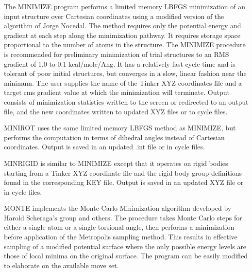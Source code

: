 \documentclass[letterpaper,11pt,english]{sphinxmanual}
\begin{document}
\sphinxAtStartPar
{}

\sphinxAtStartPar
The MINIMIZE program performs a limited memory L\sphinxhyphen{}BFGS minimization of an input structure over Cartesian coordinates using a modified version of the algorithm of Jorge Nocedal. The method requires only the potential energy and gradient at each step along the minimization pathway. It requires storage space proportional to the number of atoms in the structure. The MINIMIZE procedure is recommended for preliminary minimization of trial structures to an RMS gradient of 1.0 to 0.1 kcal/mole/Ang. It has a relatively fast cycle time and is tolerant of poor initial structures, but converges in a slow, linear fashion near the minimum. The user supplies the name of the Tinker XYZ coordinates file and a target rms gradient value at which the minimization will terminate. Output consists of minimization statistics written to the screen or redirected to an output file, and the new coordinates written to updated XYZ files or to cycle files.

\sphinxAtStartPar
{}

\sphinxAtStartPar
MINIROT uses the same limited memory L\sphinxhyphen{}BFGS method as MINIMIZE, but performs the computation in terms of dihedral angles instead of Cartesian coordinates. Output is saved in an updated .int file or in cycle files.

\sphinxAtStartPar
{}

\sphinxAtStartPar
MINRIGID is similar to MINIMIZE except that it operates on rigid bodies starting from a Tinker XYZ coordinate file and the rigid body group definitions found in the corresponding KEY file. Output is saved in an updated XYZ file or in cycle files.

\sphinxAtStartPar
{}

\sphinxAtStartPar
MONTE implements the Monte Carlo Minimization algorithm developed by Harold Scheraga’s group and others. The procedure takes Monte Carlo steps for either a single atom or a single torsional angle, then performs a minimization before application of the Metropolis sampling method. This results in effective sampling of a modified potential surface where the only possible energy levels are those of local minima on the original surface. The program can be easily modified to elaborate on the available move set.

\sphinxAtStartPar
{}
\end{document}
